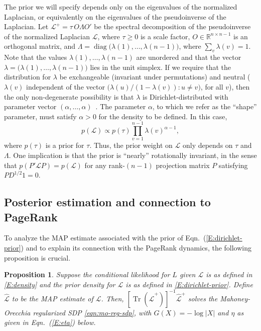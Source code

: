\documentclass[12pt]{article}
\newcommand{\reals}{\mathbb{R}}
\DeclareMathOperator*{\Tr}{Tr}
\DeclareMathOperator*{\diag}{diag}
\theoremstyle{plain}
\newtheorem{proposition}[theorem]{Proposition}
\begin{document}
The prior we will specify depends only on the eigenvalues of the normalized
Laplacian, or equivalently on the eigenvalues of the pseudoinverse of the 
Laplacian.  
Let $\mathcal{L}^+ = \tau \, O \Lambda O'$ be the spectral decomposition of 
the pseudoinverse of the normalized Laplacian $\mathcal{L}$, where $\tau \geq 0$
is a scale factor, $O \in \reals^{n \times n -1}$ is an orthogonal matrix, 
and $\Lambda = \diag\big(\lambda(1), \dotsc, \lambda({n-1})\big)$, where
$\sum_v \lambda(v) = 1$.
Note that the values $\lambda(1), \dotsc, \lambda(n-1)$ are unordered and 
that the vector $\lambda = \big(\lambda(1), \dotsc, \lambda(n-1)\big)$ lies
in the unit simplex.  
If we require that the distribution for $\lambda$ be exchangeable 
(invariant under permutations) and neutral ($\lambda(v)$ independent of the 
vector $\big(\lambda(u) / (1 - \lambda(v)) : u \neq v\big)$, for all $v$),
then the only non-degenerate possibility is that $\lambda$ is
Dirichlet-distributed with parameter vector 
$(\alpha, \ldots, \alpha)$~\cite{fabius1973two}.  
The parameter $\alpha$, to which we refer as the ``shape'' parameter, must 
satisfy $\alpha > 0$ for the density to be defined.  
In this case,
\begin{equation}\label{E:dirichlet-prior}
  p(\mathcal{L})
   \propto p(\tau) \prod_{v=1}^{n-1} \lambda(v)^{\alpha - 1},
\end{equation}
where $p(\tau)$ is a prior for $\tau$.
Thus, the prior weight on $\mathcal{L}$ only depends on $\tau$ and $\Lambda$.  
One implication is that the prior is ``nearly'' rotationally invariant, 
in the sense that $p(P' \mathcal{L} P) = p(\mathcal{L})$ for any 
rank-$(n-1)$ projection matrix $P$ satisfying $P D^{1/2} 1 = 0$.


\vspace{-2mm}
\subsection{Posterior estimation and connection to PageRank}
\label{S:posterior-density}

To analyze the MAP estimate associated with the prior of 
Eqn.~(\ref{E:dirichlet-prior}) and to explain its connection with the 
PageRank dynamics, the following proposition is crucial.

\begin{proposition}\label{P:map-sdp}
Suppose the conditional likelihood for $L$ given $\mathcal{L}$ is as 
defined in \eqref{E:density} and the prior density for $\mathcal{L}$ is as 
defined in \eqref{E:dirichlet-prior}.  
Define $\mathcal{\hat L}$ to be the MAP estimate of $\mathcal{L}$.
Then, $[\Tr(\mathcal{\hat L}^+)]^{-1} \mathcal{\hat L}^+$ solves the
Mahoney-Orecchia regularized SDP \eqref{eqn:mo-reg-sdp}, 
with $G(X) = -\log |X|$ and $\eta$ as given in Eqn.~(\ref{E:eta}) below.
\end{proposition}
\end{document}
